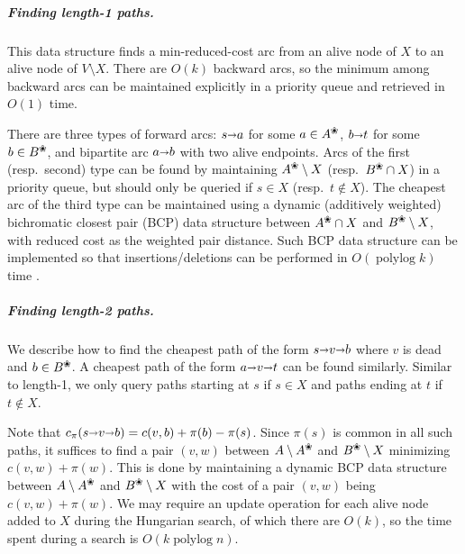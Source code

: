 \documentclass[a4paper,UKenglish]{socg-lipics-v2019}
\def\polylog{\mathop{\mathrm{polylog}}}
\def\arcto{\mathord\shortrightarrow}
\def\arc#1#2{#1\arcto#2}
\def\alive#1{{#1}^\text{\ding{96}}}
\def\dead#1{{#1} \setminus \alive{#1}}
\theoremstyle{plain}
\numberwithin{figure}{section}
\renewcommand{\paragraph}{\subparagraph}
\begin{document}
\paragraph{Finding length-1 paths.}
This data structure finds a min-reduced-cost arc from an alive node of
$X$ to an alive node of $V \setminus X$.
There are $O(k)$ backward arcs, so the minimum among backward arcs can be
maintained explicitly in a priority queue and retrieved in $O(1)$ time.

There are three types of forward arcs: $\arc sa$ for some $a \in \alive{A}$,
$\arc bt$ for some $b \in \alive{B}$, and bipartite arc $\arc ab$ with two
alive endpoints.
Arcs of the first (resp.\ second) type can be found by maintaining
$\alive{A} \setminus X$ (resp.\ $\alive{B} \cap X$) in a priority queue,
but should only be queried if $s \in X$ (resp.\ $t \not\in X$).
%
The cheapest arc of the third type can be maintained using a dynamic
(additively weighted) bichromatic closest pair (BCP) data structure between
$\alive{A} \cap X$ and $\alive{B} \setminus X$,
with reduced cost as the weighted pair distance.
Such BCP data structure can be implemented so that insertions/deletions can be performed
in $O(\polylog k)$ time \cite{KMRSS17}.

\paragraph{Finding length-2 paths.}
We describe how to find the cheapest path of the form $s \arcto v \arcto b$ where
$v$ is dead and $b \in \alive{B}$.
A cheapest path of the form $a \arcto v \arcto t$ can be found similarly.
Similar to length-1, we only query paths starting at $s$ if $s \in X$
and paths ending at $t$ if $t \not\in X$.

Note that $c_\pi(s \arcto v \arcto b) = c(v, b) + \pi(b) - \pi(s)$.
Since $\pi(s)$ is common in all such paths, it suffices to find a pair $(v,w)$ between
$\dead{A}$ and $\alive{B} \setminus X$ minimizing $c(v, w) + \pi(w)$.
This is done by maintaining a dynamic BCP data structure between
$\dead{A}$ and $\alive{B} \setminus X$ with
the cost of a pair $(v, w)$ being $c(v, w) + \pi(w)$.
We may require an update operation for each alive node added to $X$ during the
Hungarian search, of which there are $O(k)$, so the time spent during a search
is $O(k\polylog n)$.
\end{document}

